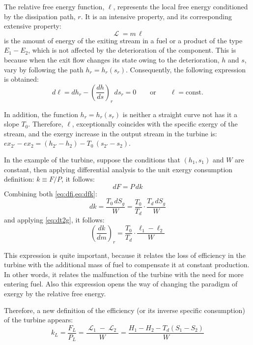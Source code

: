 \documentclass[energies,article,submit,moreauthors,pdftex]{Definitions/mdpi}
\DeclareMathOperator{\Lgdr}{\mathcal{L}}
\begin{document}
The relative free energy function, $\ell$, represents the local free energy conditioned by the dissipation path, $r$. It is an intensive property, and its corresponding extensive property: 
\begin{equation}
\Lgdr = m\,\ell
\end{equation}                                                
is the amount of energy of the exiting stream in a fuel or a product of the type $E_1-E_2$, which is not affected by the deterioration of the component. This is because when the exit flow changes its state owing to the deterioration, $h$ and $s$, vary by following the path $h_r = h_r (s_r)$. Consequently, the following expression is obtained:
\begin{equation}
d\ell = dh_r - \left(\frac{dh}{ds}\right)_r\, ds_r = 0 \qquad  \text{or} \qquad \ell = \text{const}.
\end{equation}

In addition, the function $h_r = h_r(s_r)$ is neither a straight curve not has it a slope $T_0$. Therefore, $\ell$, exceptionally coincides with the specific exergy of the stream, and the exergy increase in the output stream in the turbine is: $ex_{2'}-ex_{2}=(h_{2'}-h_2)-T_0\,(s_{2'}-s_2)$.

In the example of the turbine, suppose the conditions that $(h_1, s_1)$ and $W$ are constant, then applying differential analysis to the unit exergy consumption definition: $k\equiv F/P$, it follows:
\begin{equation}
dF=P\,dk
\label{eq:dfk}
\end{equation}
Combining both \cref{eq:dfi,eq:dfk}:
\begin{equation}
dk=\frac{T_0\,dS_g}{W}=\frac{T_0}{T_d}\cdot\frac{T_d \, dS_g}{W}
\end{equation}
and applying \cref{eq:dt2g}, it follows:
\begin{equation}
\left(\frac{dk}{dm}\right)_r = \frac{T_0}{T_d} \cdot \frac{\ell_1 - \ell_2}{W}
\end{equation}

This expression is quite important, because it relates the loss of efficiency in the turbine with the additional mass of fuel to compensate it at constant production. In other words, it relates the malfunction of the turbine with the need for more entering fuel. Also this expression opens the way of changing the paradigm of exergy by the relative free energy.

Therefore, a new definition of the efficiency (or its inverse specific consumption) of the turbine appears:
\begin{equation}
k_L = \frac{F_L}{P_L} = \frac{\Lgdr_1 - \Lgdr_2}{W}=\frac{H_1-H_2-T_d \left(S_1 - S_2\right)}{W}
\label{eq:kL}
\end{equation} 
\end{document}
